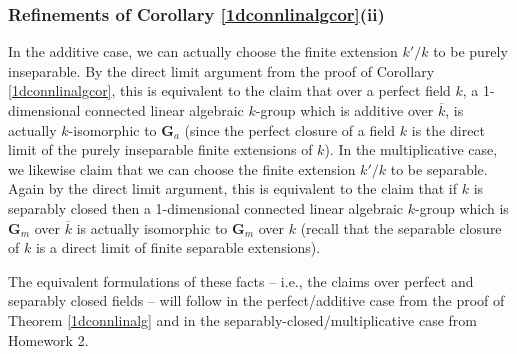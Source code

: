 \documentclass[10pt]{article}
\renewcommand{\(}{\left(}
\renewcommand{\)}{\right)}
\renewcommand{\bar}{\overline}
\numberwithin{thm}{subsection}
\begin{document}
\subsubsection*{Refinements of Corollary \ref{1dconnlinalgcor}(ii)}
In the additive case, we can actually choose the finite extension $k'/k$ to be purely inseparable.
By the direct limit argument from the proof of Corollary
\ref{1dconnlinalgcor}, this is equivalent to the claim that over a perfect
field $k$, a 1-dimensional connected linear algebraic $k$-group which is additive
over $\bar k$, is actually $k$-isomorphic to $\mathbf{G}_a$
(since the perfect closure of a field $k$ is the direct limit of the purely inseparable finite extensions of $k$). 
In the multiplicative case, we likewise claim that we can choose the finite extension $k'/k$ 
to be separable. Again by the direct limit argument, this is equivalent to the claim
that if $k$ is separably closed then a 1-dimensional connected linear algebraic $k$-group which is $\mathbf{G}_m$ over $\bar k$ is actually isomorphic to $\mathbf{G}_m$ over $k$
(recall that the separable closure of $k$ is a direct limit of
finite separable extensions). 

The equivalent formulations of these facts -- i.e., the claims over perfect and separably closed fields -- will follow in the 
perfect/additive case from the proof of Theorem \ref{1dconnlinalg} and 
 in the separably-closed/multiplicative case from Homework 2.
\end{document}
